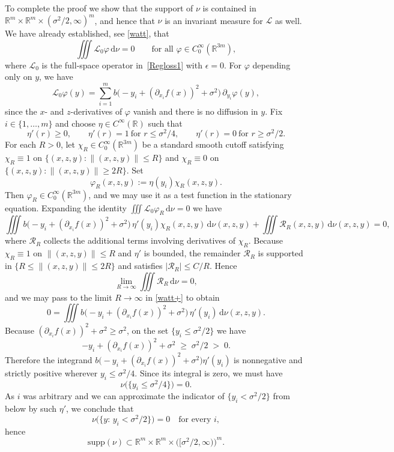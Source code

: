 \documentclass[11pt, a4paper,leqno]{amsart}
\theoremstyle{definition}
\numberwithin{equation}{section}
\newcommand{\R}{\mathbb R}
\begin{document}
To complete the proof we show that the support of $\nu$ is contained in
$\R^m\times\R^m\times(\sigma^2/2,\infty)^m$, and hence that $\nu$ is an invariant measure for
$\mathcal L$ as well. We have already established, see \eqref{watt}, that
\[
\iiint \mathcal L_0\varphi\,\mathrm d\nu = 0
\qquad\text{for all }\varphi\in C_0^\infty(\R^{3m}),
\]
where $\mathcal L_0$ is the full-space operator in~\eqref{Regloss1} with $\epsilon=0$.
For $\varphi$ depending only on $y$, we have
\[
\mathcal L_0\varphi(y)
=\sum_{i=1}^m b\bigl(-y_i+(\partial_{x_i}f(x))^2+\sigma^2\bigr)\,\partial_{y_i}\varphi(y),
\]
since the $x$- and $z$-derivatives of $\varphi$ vanish and there is no diffusion in $y$. Fix $i\in\{1,\dots,m\}$ and choose $\eta\in C^\infty(\R)$ such that
\[
\eta'(r)\ge 0,\qquad
\eta'(r)=1\ \text{for }r\le\sigma^2/4,\qquad
\eta'(r)=0\ \text{for }r\ge\sigma^2/2.
\]
For each $R>0$, let $\chi_R\in C_0^\infty(\R^{3m})$ be a standard smooth cutoff satisfying
$\chi_R\equiv1$ on $\{(x,z,y):\|(x,z,y)\|\le R\}$ and $\chi_R\equiv0$ on
$\{(x,z,y):\|(x,z,y)\|\ge 2R\}$.  Set
\[
\varphi_R(x,z,y):=\eta(y_i)\chi_R(x,z,y).
\]
Then $\varphi_R\in C_0^\infty(\R^{3m})$, and we may use it as a test function in the stationary equation.
Expanding the identity $\iiint \mathcal L_0\varphi_R\,\mathrm d\nu=0$ we have
\begin{equation}\label{watt+}
\iiint b\bigl(-y_i+(\partial_{x_i}f(x))^2+\sigma^2\bigr)\,\eta'(y_i)\chi_R(x,z,y)\,
\mathrm d\nu(x,z,y)
+ \iiint \mathcal R_R(x,z,y)\,\mathrm d\nu(x,z,y)=0,
\end{equation}
where $\mathcal R_R$ collects the additional terms involving derivatives of $\chi_R$.
Because $\chi_R\equiv1$ on $\|(x,z,y)\|\le R$ and $\eta'$ is bounded,
the remainder $\mathcal R_R$ is supported in $\{R\le \|(x,z,y)\|\le 2R\}$ and satisfies
$|\mathcal R_R|\le C/R$. Hence
\[
\lim_{R\to\infty}\iiint \mathcal R_R\,\mathrm d\nu=0,
\]
and we may pass to the limit $R\to\infty$ in \eqref{watt+} to obtain
\[
0=\iiint b\bigl(-y_i+(\partial_{x_i}f(x))^2+\sigma^2\bigr)\,\eta'(y_i)\,\mathrm d\nu(x,z,y).
\]
Because $(\partial_{x_i}f(x))^2+\sigma^2\ge\sigma^2$, on the set $\{y_i\le\sigma^2/2\}$ we have
\[
-y_i+(\partial_{x_i}f(x))^2+\sigma^2 \;\ge\; \sigma^2/2 \;>\; 0.
\]
Therefore the integrand
$b\bigl(-y_i+(\partial_{x_i}f(x))^2+\sigma^2\bigr)\eta'(y_i)$
is nonnegative and strictly positive wherever $y_i\le\sigma^2/4$.
Since its integral is zero, we must have
\[
\nu\bigl(\{y_i\le\sigma^2/4\}\bigr)=0.
\]
As $i$ was arbitrary and we can approximate the indicator of $\{y_i<\sigma^2/2\}$
from below by such $\eta'$, we conclude that
\[
\nu\bigl(\{y:\,y_i<\sigma^2/2\}\bigr)=0
\quad\text{for every }i,
\]
hence
\[
\mathrm{supp}(\nu)
\subset
\R^m\times\R^m\times\bigl([\sigma^2/2,\infty)\bigr)^m.
\]
\end{document}
